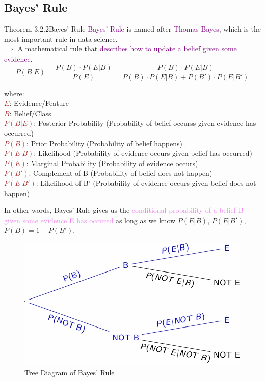 \documentclass{book}
\begin{document}
\subsection{Bayes' Rule}
\begin{thmBox}{Theorem 3.2.2}{Bayes' Rule}
    \textcolor{purple}{Bayes' Rule} is named after \textcolor{purple}{Thomas Bayes}, which is the most important rule in data science.\\
    $\Rightarrow$ A mathematical rule that \textcolor{purple}{describes how to update a belief given some evidence}.
        \[
            P(B|E) = \frac{P(B) \cdot P(E|B)}{P(E)} = \frac{P(B) \cdot P(E|B)}{P(B) \cdot P(E|B) + P(B') \cdot P(E|B')}
        \]
        \raggedright
        where:\\
        \textcolor{brown}{\(E\)}: Evidence/Feature\\
        \textcolor{brown}{\(B\)}: Belief/Class\\
        \textcolor{brown}{\(P(B|E)\)}: Posterior Probability (Probability of belief occurss given evidence has occurred)\\
        \textcolor{brown}{\(P(B)\)}: Prior Probability (Probability of belief happens)\\
        \textcolor{brown}{\(P(E|B)\)}: Likelihood (Probability of evidence occurs given belief has occurred)\\
        \textcolor{brown}{\(P(E)\)}: Marginal Probability (Probability of evidence occurs)\\
        \textcolor{brown}{\(P(B')\)}: Complement of B (Probability of belief does not happen)\\
        \textcolor{brown}{\(P(E|B')\)}: Likelihood of B' (Probability of evidence occurs given belief does not happen)
\end{thmBox}
In other words, Bayes' Rule gives us the \textcolor{violet}{conditional probability of a belief B given some evidence E has occured} as long as we know \(P(E|B)\), \(P(E|B')\), \(P(B)=1-P(B')\).\\
\begin{figure}[h]
    \centering
    \includegraphics[scale=0.7]{chapter 3/ch3_figure3.jpeg}
    \caption{Tree Diagram of Bayes' Rule}
\end{figure}
\end{document}
